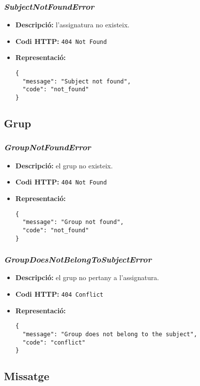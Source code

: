 \subsubsection{\emph{SubjectNotFoundError}}
\begin{itemize}
	\item \textbf{Descripció:} l'assignatura no existeix.
	\item \textbf{Codi \ac{HTTP}:} \texttt{404 Not Found}
	\item \textbf{Representació:}
\begin{verbatim}
{
  "message": "Subject not found",
  "code": "not_found"
}
\end{verbatim}
\end{itemize}
\subsection{Grup}
\subsubsection{\emph{GroupNotFoundError}}
\begin{itemize}
	\item \textbf{Descripció:} el grup no existeix.
	\item \textbf{Codi \ac{HTTP}:} \texttt{404 Not Found}
	\item \textbf{Representació:}
\begin{verbatim}
{
  "message": "Group not found",
  "code": "not_found"
}
\end{verbatim}
\end{itemize}

\subsubsection{\emph{GroupDoesNotBelongToSubjectError}}
\begin{itemize}
	\item \textbf{Descripció:} el grup no pertany a l'assignatura.
	\item \textbf{Codi \ac{HTTP}:} \texttt{404 Conflict}
	\item \textbf{Representació:}
\begin{verbatim}
{
  "message": "Group does not belong to the subject",
  "code": "conflict"
}
\end{verbatim}
\end{itemize}

\subsection{Missatge}
